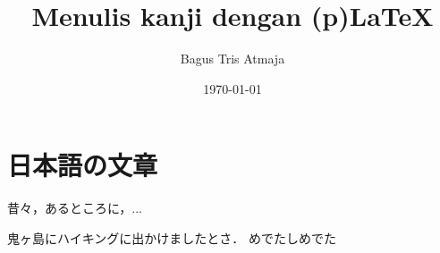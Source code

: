 \documentclass[a4paper]{jarticle}
\title{Menulis kanji dengan (p)\LaTeX}
\author{Bagus Tris Atmaja}
\date{\today}
\begin{document}
	\maketitle
	\section{日本語の文章}
		昔々，あるところに，...

		鬼ヶ島にハイキングに出かけましたとさ．
		めでたしめでた
\end{document}
